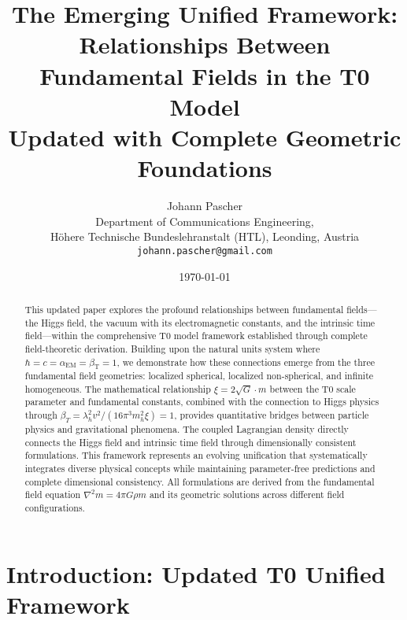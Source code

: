 \documentclass[12pt,a4paper]{article}
\begin{document}
	
	\title{The Emerging Unified Framework:\\Relationships Between Fundamental Fields in the T0 Model\\Updated with Complete Geometric Foundations}
	\author{Johann Pascher\\
		Department of Communications Engineering, \\Höhere Technische Bundeslehranstalt (HTL), Leonding, Austria\\
		\texttt{johann.pascher@gmail.com}}
	\date{\today}
	
	\maketitle
	
	\begin{abstract}
		This updated paper explores the profound relationships between fundamental fields—the Higgs field, the vacuum with its electromagnetic constants, and the intrinsic time field—within the comprehensive T0 model framework established through complete field-theoretic derivation. Building upon the natural units system where $\hbar = c = \alpha_{\text{EM}} = \beta_{\text{T}} = 1$, we demonstrate how these connections emerge from the three fundamental field geometries: localized spherical, localized non-spherical, and infinite homogeneous. The mathematical relationship $\xi = 2\sqrt{G} \cdot m$ between the T0 scale parameter and fundamental constants, combined with the connection to Higgs physics through $\beta_T = \lambda_h^2 v^2/(16\pi^3 m_h^2 \xi) = 1$, provides quantitative bridges between particle physics and gravitational phenomena. The coupled Lagrangian density directly connects the Higgs field and intrinsic time field through dimensionally consistent formulations. This framework represents an evolving unification that systematically integrates diverse physical concepts while maintaining parameter-free predictions and complete dimensional consistency. All formulations are derived from the fundamental field equation $\nabla^2 m = 4\pi G \rho m$ and its geometric solutions across different field configurations.
	\end{abstract}
	
	\newpage
	\tableofcontents
	\newpage
	
	\section{Introduction: Updated T0 Unified Framework}
	\label{sec:introduction}
	
\end{document}
